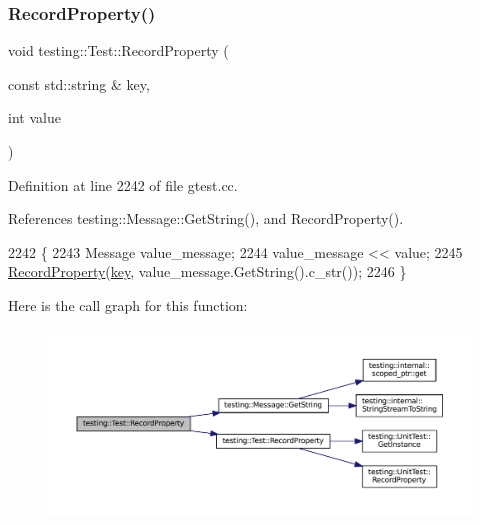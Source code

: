 \subsubsection{\texorpdfstring{Record\+Property()}{RecordProperty()}\hspace{0.1cm}{\footnotesize\ttfamily [2/2]}}
{\footnotesize\ttfamily void testing\+::\+Test\+::\+Record\+Property (\begin{DoxyParamCaption}\item[{const std\+::string \&}]{key,  }\item[{int}]{value }\end{DoxyParamCaption})\hspace{0.3cm}{\ttfamily [static]}}



Definition at line 2242 of file gtest.\+cc.



References testing\+::\+Message\+::\+Get\+String(), and Record\+Property().


\begin{DoxyCode}
2242                                                          \{
2243   Message value\_message;
2244   value\_message << value;
2245   \hyperlink{classtesting_1_1Test_a7b20a48c0bbc9dd1fe96715e4a5c0164}{RecordProperty}(\hyperlink{namespacekeyboard__server__node_af0ebd8a9e1564ddc13a227c727602466}{key}, value\_message.GetString().c\_str());
2246 \}
\end{DoxyCode}
Here is the call graph for this function\+:
\nopagebreak
\begin{figure}[H]
\begin{center}
\leavevmode
\includegraphics[width=350pt]{classtesting_1_1Test_afb8d29af28e48dc65b2b743f1874ccfe_cgraph}
\end{center}
\end{figure}
\mbox{\label{classtesting_1_1Test_a939ae280a6f2f1c3d43708ec616684ed}} 
